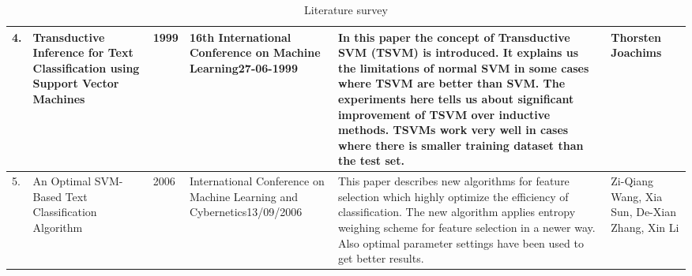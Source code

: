 \documentclass{report}
\begin{document}
\begin{table}[!h]
\begin{tabular}{|p{0.6cm}|p{2.5cm}|p{0.6cm}|p{3.3cm}|p{5.1cm}|p{2.0cm}|}
4.\rule{0pt}{3ex}              & Transductive Inference for Text Classification using Support Vector Machines \cite{joachims1999transductive}   & 1999          & 16th International Conference on Machine Learning27-06-1999                                                   & In this paper the concept of Transductive SVM (TSVM)  is introduced. It explains us the limitations of normal SVM in some cases where TSVM are better than SVM. The experiments here tells us about significant improvement of TSVM over inductive methods. TSVMs work very well in cases where there is smaller training dataset than the test set.                & Thorsten Joachims                                     \\ \hline
5.\rule{0pt}{3ex}              & An Optimal SVM-Based Text Classification Algorithm \cite{wang2006optimal}                             & 2006          & International Conference on Machine Learning and Cybernetics13/09/2006                                        & This paper describes new algorithms for feature selection which highly optimize the efficiency of classification. The new algorithm applies entropy weighing scheme for feature selection in a newer way. Also optimal parameter settings have been used to get better results.                                                                                     & Zi-Qiang Wang, Xia Sun, De-Xian Zhang, Xin Li         \\ \hline
\end{tabular}
\caption{Literature survey}
\end{table}
\pagebreak

\end{document}
